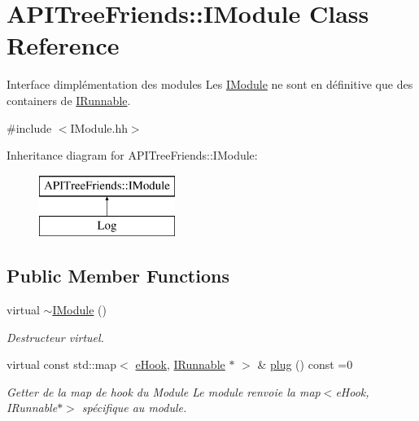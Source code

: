 \hypertarget{class_a_p_i_tree_friends_1_1_i_module}{}\section{A\+P\+I\+Tree\+Friends\+:\+:I\+Module Class Reference}
\label{class_a_p_i_tree_friends_1_1_i_module}


Interface d\textquotesingle{}implémentation des modules Les \hyperlink{class_a_p_i_tree_friends_1_1_i_module}{I\+Module} ne sont en définitive que des containers de \hyperlink{class_a_p_i_tree_friends_1_1_i_runnable}{I\+Runnable}.  




{\ttfamily \#include $<$I\+Module.\+hh$>$}

Inheritance diagram for A\+P\+I\+Tree\+Friends\+:\+:I\+Module\+:\begin{figure}[H]
\begin{center}
\leavevmode
\includegraphics[height=2.000000cm]{class_a_p_i_tree_friends_1_1_i_module}
\end{center}
\end{figure}
\subsection*{Public Member Functions}
\begin{DoxyCompactItemize}
\item 
\hypertarget{class_a_p_i_tree_friends_1_1_i_module_aa22ef80601340718cee4f78eec47b9ba}{}virtual \hyperlink{class_a_p_i_tree_friends_1_1_i_module_aa22ef80601340718cee4f78eec47b9ba}{$\sim$\+I\+Module} ()\label{class_a_p_i_tree_friends_1_1_i_module_aa22ef80601340718cee4f78eec47b9ba}

\begin{DoxyCompactList}\small\item\em Destructeur virtuel. \end{DoxyCompactList}\item 
virtual const std\+::map$<$ \hyperlink{namespace_a_p_i_tree_friends_a3943902c0fe96b820b0261e510dcb720}{e\+Hook}, \hyperlink{class_a_p_i_tree_friends_1_1_i_runnable}{I\+Runnable} $\ast$ $>$ \& \hyperlink{class_a_p_i_tree_friends_1_1_i_module_a9efbed18c7d4b44ee8c455a39e997cea}{plug} () const =0
\begin{DoxyCompactList}\small\item\em Getter de la map de hook du Module Le module renvoie la map$<$e\+Hook, I\+Runnable$\ast$$>$ spécifique au module. \end{DoxyCompactList}\end{DoxyCompactItemize}


